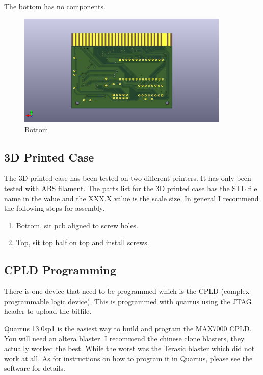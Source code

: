 \par
The bottom has no components.

\begin{figure}[h!]
\caption{Bottom}
\centering
\includegraphics[width=0.90\textwidth,keepaspectratio]{img/ogm_bottom.png}
\end{figure}

\subsection{3D Printed Case}

\par
The 3D printed case has been tested on two different printers. It has only been tested with ABS filament.
The parts list for the 3D printed case has the STL file name in the value and the XXX.X value is the scale size.
In general I recommend the following steps for assembly.

\begin{enumerate}
  \item Bottom, sit pcb aligned to screw holes.
  \item Top, sit top half on top and install screws.
\end{enumerate}

\subsection{CPLD Programming}

\par
There is one device that need to be programmed which is the CPLD (complex programmable logic device).
This is programmed with quartus using the JTAG header to upload the bitfile.
\par
Quartus 13.0sp1 is the easiest way to build and program the MAX7000 CPLD. You will need an altera blaster.
I recommend the chinese clone blasters, they actually worked the best. While the worst was the Terasic blaster
which did not work at all. As for instructions on how to program it in Quartus, please see the software for details.

